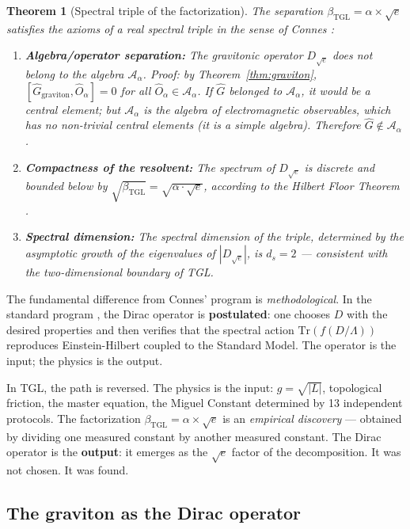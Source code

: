 \documentclass[12pt,a4paper,twoside]{article}
\newtheorem{theorem}{Theorem}[section]
\newcommand{\betatgl}{\beta_{\!\scriptscriptstyle\mathrm{TGL}}}
\newcommand{\boundary}{\textit{boundary}}
\begin{document}
\begin{theorem}[Spectral triple of the factorization]
\label{thm:tripla}
The separation $\betatgl = \alpha \times \sqrt{e}$ satisfies the axioms of a real spectral triple in the sense of Connes \cite{Connes1996}:
\begin{enumerate}[nosep]
\item \textbf{Algebra/operator separation:} The gravitonic operator $D_{\sqrt{e}}$ does not belong to the algebra $\mathcal{A}_\alpha$. Proof: by Theorem~\ref{thm:graviton}, $[\hat{G}_{\text{graviton}}, \hat{O}_\alpha] = 0$ for all $\hat{O}_\alpha \in \mathcal{A}_\alpha$. If $\hat{G}$ belonged to $\mathcal{A}_\alpha$, it would be a central element; but $\mathcal{A}_\alpha$ is the algebra of electromagnetic observables, which has no non-trivial central elements (it is a simple algebra). Therefore $\hat{G} \notin \mathcal{A}_\alpha$.
\item \textbf{Compactness of the resolvent:} The spectrum of $D_{\sqrt{e}}$ is discrete and bounded below by $\sqrt{\betatgl} = \sqrt{\alpha \cdot \sqrt{e}}$, according to the Hilbert Floor Theorem \cite{Miguel2026Graviton}.
\item \textbf{Spectral dimension:} The spectral dimension of the triple, determined by the asymptotic growth of the eigenvalues of $|D_{\sqrt{e}}|$, is $d_s = 2$ --- consistent with the two-dimensional \boundary{} of TGL.
\end{enumerate}
\end{theorem}

The fundamental difference from Connes' program is \textit{methodological}. In the standard program \cite{Connes1996, Chamseddine1997}, the Dirac operator is \textbf{postulated}: one chooses $D$ with the desired properties and then verifies that the spectral action $\text{Tr}(f(D/\Lambda))$ reproduces Einstein-Hilbert coupled to the Standard Model. The operator is the input; the physics is the output.

In TGL, the path is reversed. The physics is the input: $g = \sqrt{|L|}$, topological friction, the master equation, the Miguel Constant determined by 13 independent protocols. The factorization $\betatgl = \alpha \times \sqrt{e}$ is an \textit{empirical discovery} --- obtained by dividing one measured constant by another measured constant. The Dirac operator is the \textbf{output}: it emerges as the $\sqrt{e}$ factor of the decomposition. It was not chosen. It was found.


\subsection{The graviton as the Dirac operator}
\label{subsec:dirac}
\end{document}
